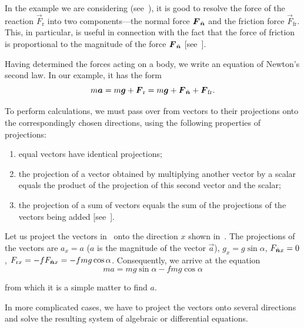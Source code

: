 In the example we are considering (see~), it is good to resolve the force of the reaction $\vec{F}_{\text{r}}$ into two components---the normal force $\boldsymbol{F}_{\hat{\boldsymbol{n}}}$ and the friction force $\vec{F}_{\text{fr}}$. This, in particular, is useful in connection with the fact that the force of friction is proportional to the magnitude of the force $\boldsymbol{F}_{\hat{\boldsymbol{n}}}$ [see~].

Having determined the forces acting on a body, we write an equation of Newton's second law. In our example, it has the form
\begin{equation}\label{eq:2_42}
m\boldsymbol{a} = m\boldsymbol{g} + \boldsymbol{F}_{\text{r}} = m\boldsymbol{g} + \boldsymbol{F}_{\hat{\boldsymbol{n}}} + \boldsymbol{F}_{\text{fr}}.
\end{equation}

\noindent
To perform calculations, we must pass over from vectors to their projections onto the correspondingly chosen directions, using the following properties of projections:
\begin{enumerate}[(1)]
	\item equal vectors have identical projections;
	\item the projection of a vector obtained by multiplying another vector by a scalar equals the product of the projection of this second vector and the scalar;
	\item the projection of a sum of vectors equals the sum of the projections of the vectors being added [see~].
\end{enumerate}

Let us project the vectors in~ onto the direction $x$ shown in~. The projections of the vectors are $a_x=a$ ($a$ is the magnitude of the vector $\vec{a}$), $g_x=g\sin\alpha$, $F_{\hat{\boldsymbol{n}}x}=0$, $F_{\text{r}x}=-f F_{\hat{\boldsymbol{n}}x}=-fmg\cos\alpha$. Consequently, we arrive at the equation
\begin{equation*}
ma = mg\sin\alpha - fmg\cos\alpha
\end{equation*}

\noindent
from which it is a simple matter to find $a$.

In more complicated cases, we have to project the vectors onto several directions and solve the resulting system of algebraic or differential equations.
